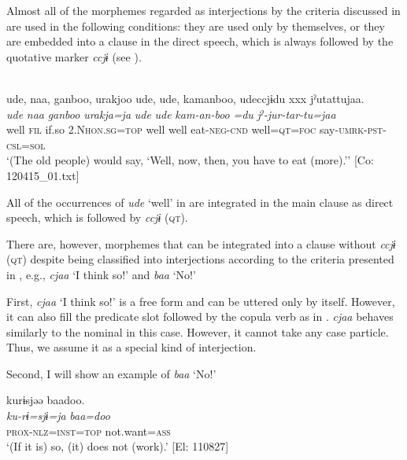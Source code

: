   Almost all of the morphemes regarded as interjections by the criteria discussed in  are used in the following conditions: they are used only by themselves, or they are embedded into a clause in the direct speech, which is always followed by the quotative marker \textit{ccjɨ} (see ).

\ea{} \label{ex:4.57}\\
\glll   ude,  naa,  ganboo,  urakjoo  ude,  ude,  kamanboo,   udeccjɨdu  xxx  jˀutattujaa.\\
    \textit{ude}  \textit{naa}  \textit{ganboo}  \textit{urakja=ja}  \textit{ude}  \textit{ude}  \textit{kam-an-boo}   \textit{=du}    \textit{jˀ-jur-tar-tu=jaa}\\
    well  \textsc{fil}  if.so  2.N\textsc{hon}.\textsc{sg}=\textsc{top}  well  well  eat-\textsc{neg}-\textsc{cnd}                                                            well=\textsc{qt}=\textsc{foc}    say-\textsc{umrk}-\textsc{pst}-\textsc{csl}=\textsc{sol}\\
  \glt     ‘(The old people) would say, ‘Well, now, then, you have to eat (more).’’ [Co: 120415\_01.txt]
  \z

All of the occurrences of \textit{ude} ‘well’ in  are integrated in the main clause as direct speech, which is followed by \textit{ccjɨ} (\textsc{qt}).

There are, however, morphemes that can be integrated into a clause without \textit{ccjɨ} (\textsc{qt}) despite being classified into interjections according to the criteria presented in , e.g., \textit{cjaa} ‘I think so!’ and \textit{baa} ‘No!’

First, \textit{cjaa} ‘I think so!’ is a free form and can be uttered only by itself. However, it can also fill the predicate slot followed by the copula verb as in . \textit{cjaa} behaves similarly to the nominal in this case. However, it cannot take any case particle. Thus, we assume it as a special kind of interjection.

Second, I will show an example of \textit{baa} ‘No!’

\ea \label{ex:4.58}
\glll    kurɨsjəə  baadoo.\\
    \textit{ku-rɨ=sjɨ=ja}  \textit{baa=doo}\\
    \textsc{prox}-\textsc{nlz}=\textsc{inst}=\textsc{top}  not.want=\textsc{ass}\\
  \glt     ‘(If it is) so, (it) does not (work).’ [El: 110827]
\z

